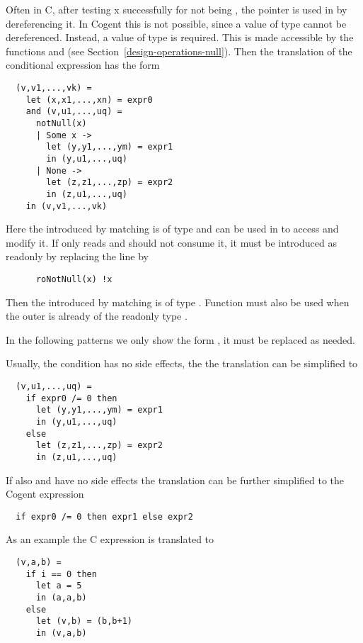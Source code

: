 Often in C, after testing x successfully for not being , the pointer  is used in 
 by dereferencing it. In Cogent this is not possible, since a value of type  cannot
be dereferenced. Instead, a value of type  is required. This is made accessible by the functions
 and  (see Section~\ref{design-operations-null}). Then the translation of the
conditional expression has the form
\begin{verbatim}
  (v,v1,...,vk) = 
    let (x,x1,...,xn) = expr0
    and (v,u1,...,uq) =
      notNull(x)
      | Some x -> 
        let (y,y1,...,ym) = expr1 
        in (y,u1,...,uq)
      | None ->
        let (z,z1,...,zp) = expr2
        in (z,u1,...,uq)
    in (v,v1,...,vk) 
\end{verbatim}
Here the  introduced by matching  is of type  and can be used in 
to access and modify it. If  only reads  and should not consume it, it must be introduced
as readonly by replacing the line  by
\begin{verbatim}
      roNotNull(x) !x
\end{verbatim}
Then the  introduced by matching  is of type . Function  must also
be used when the outer  is already of the readonly type .

In the following patterns we only show the form , it must be replaced as needed.

Usually, the condition  has no side effects, the the translation can be simplified to
\begin{verbatim}
  (v,u1,...,uq) = 
    if expr0 /= 0 then 
      let (y,y1,...,ym) = expr1 
      in (y,u1,...,uq)
    else
      let (z,z1,...,zp) = expr2
      in (z,u1,...,uq)
\end{verbatim}

If also  and  have no side effects the translation can be further simplified to
the Cogent expression
\begin{verbatim}
  if expr0 /= 0 then expr1 else expr2
\end{verbatim}

As an example the C expression  is translated to
\begin{verbatim}
  (v,a,b) = 
    if i == 0 then 
      let a = 5
      in (a,a,b)
    else
      let (v,b) = (b,b+1)
      in (v,a,b)
\end{verbatim}

